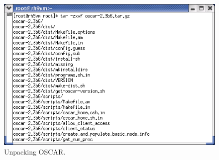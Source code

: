 
\begin{figure}[h!]
  \begin{center}
    \centerline{\includegraphics[scale=\imgscale]{figs/0c_sbs-unpack}}
    \caption{Unpacking OSCAR.}
    \label{fig:sbs-unpacking-oscar}
  \end{center}
\end{figure}

